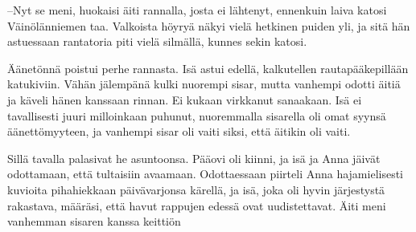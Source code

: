 \documentclass[a4paper,finnish,12pt]{scrartcl}
\begin{document}
--Nyt se meni, huokaisi äiti rannalla, josta ei lähtenyt, ennenkuin
laiva katosi Väinölänniemen taa. Valkoista höyryä näkyi vielä hetkinen
puiden yli, ja sitä hän astuessaan rantatoria piti vielä silmällä,
kunnes sekin katosi.

Äänetönnä poistui perhe rannasta. Isä astui edellä, kalkutellen
rautapääkepillään katukiviin. Vähän jälempänä kulki nuorempi sisar,
mutta vanhempi odotti äitiä ja käveli hänen kanssaan rinnan. Ei kukaan
virkkanut sanaakaan. Isä ei tavallisesti juuri milloinkaan puhunut,
nuoremmalla sisarella oli omat syynsä äänettömyyteen, ja vanhempi sisar
oli vaiti siksi, että äitikin oli vaiti.

Sillä tavalla palasivat he asuntoonsa. Pääovi oli kiinni, ja isä ja
Anna jäivät odottamaan, että tultaisiin avaamaan. Odottaessaan piirteli
Anna hajamielisesti kuvioita pihahiekkaan päivävarjonsa kärellä, ja
isä, joka oli hyvin järjestystä rakastava, määräsi, että havut rappujen
edessä ovat uudistettavat. Äiti meni vanhemman sisaren kanssa keittiön
\end{document}
